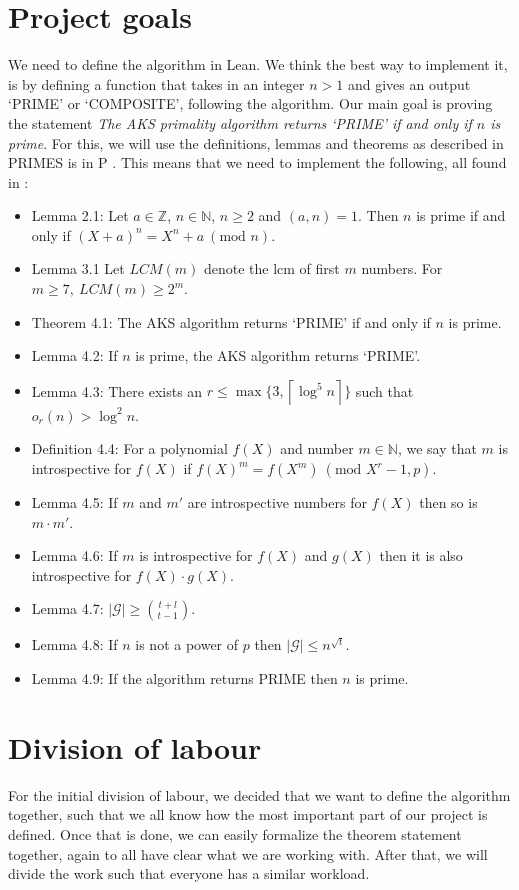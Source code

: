 \documentclass[10pt,a4paper]{article}
\newcommand{\0}{\textbf{0}}
\newcommand{\N}{\mathbb{N}}
\newcommand{\Z}{\mathbb{Z}}
\begin{document}
	\section*{Project goals}
	We need to define the algorithm in Lean. We think the best way to implement it, is by defining a function that takes in an integer $n>1$ and gives an output `PRIME' or `COMPOSITE', following the algorithm.
	Our main goal is proving the statement \textit{The AKS primality algorithm returns `PRIME' if and only if $n$ is prime}.
	For this, we will use the definitions, lemmas and theorems as described in PRIMES is in P \cite{PRIMES in P}. This means that we need to implement the following, all found in \cite{PRIMES in P}:
	\begin{itemize}
		\item Lemma 2.1: Let $a\in\Z$, $n\in\N$, $n\geq2$ and $(a,n)=1$. Then $n$ is prime if and only if $(X+a)^n=X^n+a \ (\text{mod } n)$.
  		\item Lemma 3.1 Let $LCM(m)$ denote the lcm of first $m$ numbers. For $m \ge 7,\ LCM(m) \ge 2^m$.
		\item Theorem 4.1: The AKS algorithm returns `PRIME' if and only if $n$ is prime.
		\item Lemma 4.2: If $n$ is prime, the AKS algorithm returns `PRIME'.
		\item Lemma 4.3: There exists an $r\leq \max\{3,\left\lceil \log^5n\right\rceil\}$ such that $o_r(n)>\log^2n$.
		\item Definition 4.4: For a polynomial $f(X)$ and number $m\in\N$, we say that $m$ is introspective for $f(X)$ if $f(X)^m=f(X^m)\ (\text{mod } X^r-1,p)$.
		\item Lemma 4.5: If $m$ and $m'$ are introspective numbers for $f (X)$ then so is $m \cdot m'$.
		\item Lemma 4.6: If $m$ is introspective for $f(X)$ and $g(X)$ then it is also introspective for $f (X) \cdot g(X)$.
		\item Lemma 4.7: $|\mathcal{G}| \ge {t+l \choose t-1} $.
		\item Lemma 4.8: If $n$ is not a power of $p$ then $|\mathcal{G}|\le n^{\sqrt t}$.
		\item Lemma 4.9: If the algorithm returns PRIME then $n$ is prime.
	\end{itemize}
	
	\section*{Division of labour}
	For the initial division of labour, we decided that we want to define the algorithm together, such that we all know how the most important part of our project is defined.
	Once that is done, we can easily formalize the theorem statement together, again to all have clear what we are working with.
	After that, we will divide the work such that everyone has a similar workload.
	
\end{document}
